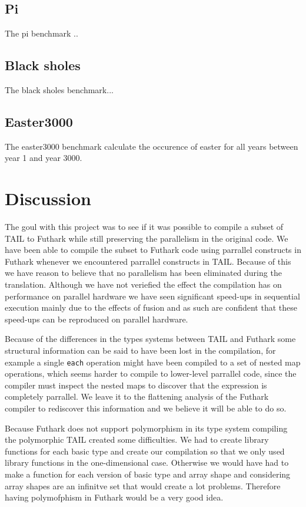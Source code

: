 \documentclass[11pt]{article}
\begin{document}
\subsection{Pi}
The pi benchmark ..

\subsection{Black sholes}
The black sholes benchmark...

\subsection{Easter3000}
The easter3000 benchmark calculate the occurence of easter for all years between year 1 and year 3000. 

\section{Discussion}
The goul with this project was to see if it was possible to compile a subset of TAIL \cite{ElsmanDybdal:Array:2014} to Futhark while still preserving the parallelism in the original code. 
We have been able to compile the subset to Futhark code using parrallel constructs in Futhark whenever we encountered parrallel constructs in TAIL. Because of this we have reason to believe that no parallelism has been eliminated during the translation.
Although we have not veriefied the effect the compilation has on performance on parallel hardware we have seen significant speed-ups
in sequential execution mainly due to the effects of fusion and as such are confident that these speed-ups can be reproduced on parallel hardware.

Because of the differences in the types systems between TAIL and Futhark some structural information can be said to have been lost
in the compilation, for example a single {\tt each} operation might have been compiled to a set of nested map operations,
which seems harder to compile to lower-level parrallel code, since the compiler must inspect the nested maps to discover that
the expression is completely parrallel. We leave it to the flattening analysis of the Futhark compiler to rediscover this
information and we believe it will be able to do so.

Because Futhark does not support polymorphism in its type system compiling the polymorphic TAIL created some difficulties.
We had to create library functions for each basic type and create our compilation so that we only used library functions in the one-dimensional case.
Otherwise we would have had to make a function for each version of basic type and array shape and considering array shapes are an infinitve set that would create a lot problems. Therefore having polymofphism in Futhark would be a very good idea.
\end{document}
